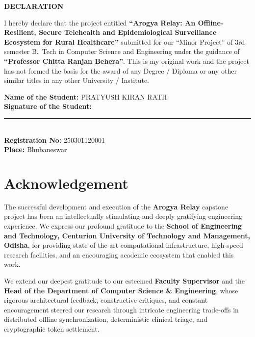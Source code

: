 \documentclass[12pt,a4paper,oneside]{report}
\begin{document}
\clearpage

\thispagestyle{plain}

\begin{center}
    {\fontsize{16}{20}\selectfont \bfseries DECLARATION}
\end{center}
\vspace{1.0cm}

{\fontsize{13}{20}\selectfont
\noindent I hereby declare that the project entitled \textbf{``Arogya Relay: An Offline-Resilient, Secure Telehealth and Epidemiological Surveillance Ecosystem for Rural Healthcare''} submitted for our ``Minor Project'' of 3rd semester B.~Tech in Computer Science and Engineering under the guidance of \textbf{``Professor Chitta Ranjan Behera''}. This is my original work and the project has not formed the basis for the award of any Degree / Diploma or any other similar titles in any other University / Institute.
}

\vspace{3.5cm}

\noindent
{\fontsize{13}{22}\selectfont
\textbf{Name of the Student:} PRATYUSH KIRAN RATH \\[0.4cm]
\textbf{Signature of the Student:} \rule{5.5cm}{0.4pt} \\[0.4cm]
\textbf{Registration No:} 250301120001 \\[0.4cm]
\textbf{Place:} Bhubaneswar
}

\clearpage
\chapter*{Acknowledgement}

The successful development and execution of the \textbf{Arogya Relay} capstone project has been an intellectually stimulating and deeply gratifying engineering experience. We express our profound gratitude to the \textbf{School of Engineering and Technology, Centurion University of Technology and Management, Odisha}, for providing state-of-the-art computational infrastructure, high-speed research facilities, and an encouraging academic ecosystem that enabled this work.

\vspace{0.4cm}
We extend our deepest gratitude to our esteemed \textbf{Faculty Supervisor} and the \textbf{Head of the Department of Computer Science \& Engineering}, whose rigorous architectural feedback, constructive critiques, and constant encouragement steered our research through intricate engineering trade-offs in distributed offline synchronization, deterministic clinical triage, and cryptographic token settlement.
\end{document}
